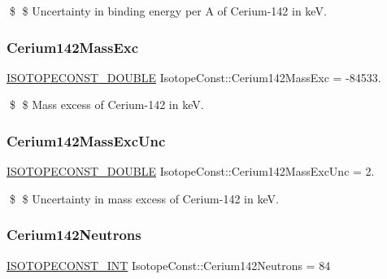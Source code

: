\$ \$ Uncertainty in binding energy per A of Cerium-\/142 in keV. \mbox{\label{group___isotope_const-_cerium-_ce142_ga2c3f3dd958f3a7e325bc58a247335596}} 
\subsubsection{\texorpdfstring{Cerium142\+Mass\+Exc}{Cerium142MassExc}}
{\footnotesize\ttfamily \mbox{\hyperlink{group___isotope_const-_macros_ga8f45a7272ce02c0b4c65c44636ed719a}{I\+S\+O\+T\+O\+P\+E\+C\+O\+N\+S\+T\+\_\+\+D\+O\+U\+B\+LE}} Isotope\+Const\+::\+Cerium142\+Mass\+Exc = -\/84533.}

\$ \$ Mass excess of Cerium-\/142 in keV. \mbox{\label{group___isotope_const-_cerium-_ce142_ga5f83a2368826aaefaa83c2e26f4a7ed5}} 
\subsubsection{\texorpdfstring{Cerium142\+Mass\+Exc\+Unc}{Cerium142MassExcUnc}}
{\footnotesize\ttfamily \mbox{\hyperlink{group___isotope_const-_macros_ga8f45a7272ce02c0b4c65c44636ed719a}{I\+S\+O\+T\+O\+P\+E\+C\+O\+N\+S\+T\+\_\+\+D\+O\+U\+B\+LE}} Isotope\+Const\+::\+Cerium142\+Mass\+Exc\+Unc = 2.}

\$ \$ Uncertainty in mass excess of Cerium-\/142 in keV. \mbox{\label{group___isotope_const-_cerium-_ce142_ga807b9dd8f77fbaf9d8af4005c6f62a36}} 
\subsubsection{\texorpdfstring{Cerium142\+Neutrons}{Cerium142Neutrons}}
{\footnotesize\ttfamily \mbox{\hyperlink{group___isotope_const-_macros_ga5f18360b3e99483a35c32d789e62621c}{I\+S\+O\+T\+O\+P\+E\+C\+O\+N\+S\+T\+\_\+\+I\+NT}} Isotope\+Const\+::\+Cerium142\+Neutrons = 84}

